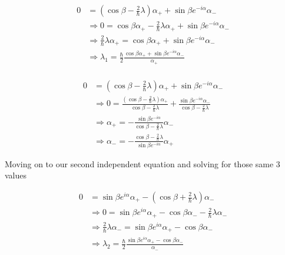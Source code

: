 \begin{answer}
  \begin{equation}
    \begin{split}
      0
      &= (\cos{\beta}-\frac{2}{\hbar}\lambda)\alpha_+ + \sin{\beta}e^{-i\alpha}\alpha_-\\
      &\Rightarrow
      0 = \cos{\beta}\alpha_+ - \frac{2}{\hbar}\lambda\alpha_+ + \sin{\beta}e^{-i\alpha}\alpha_-\\
      &\Rightarrow
      \frac{2}{\hbar}\lambda\alpha_+ = \cos{\beta}\alpha_+ + \sin{\beta}e^{-i\alpha}\alpha_-\\
      &\Rightarrow
      \lambda_1 = \frac{\hbar}{2}\frac{\cos{\beta}\alpha_+ + \sin{\beta}e^{-i\alpha}\alpha_-}{\alpha_+}\\
    \end{split}
  \end{equation}

  \begin{equation}
    \begin{split}
      0
      &= (\cos{\beta}-\frac{2}{\hbar}\lambda)\alpha_+ + \sin{\beta}e^{-i\alpha}\alpha_-\\
      &\Rightarrow
      0 = \frac{(\cos{\beta}-\frac{2}{\hbar}\lambda)\alpha_+}{\cos{\beta}-\frac{2}{\hbar}\lambda} + \frac{\sin{\beta}e^{-i\alpha}\alpha_-}{\cos{\beta}-\frac{2}{\hbar}\lambda}\\
      &\Rightarrow
      \alpha_+ = - \frac{\sin{\beta}e^{-i\alpha}}{\cos{\beta}-\frac{2}{\hbar}\lambda}\alpha_-\\
      &\Rightarrow
      \alpha_- = - \frac{\cos{\beta}-\frac{2}{\hbar}\lambda}{\sin{\beta}e^{-i\alpha}}\alpha_+
    \end{split}
  \end{equation}

  Moving on to our second independent equation and solving for those same 3 values
  
  \begin{equation}
    \begin{split}
      0
      &= \sin{\beta}e^{i\alpha}\alpha_+ - (\cos{\beta} + \frac{2}{\hbar}\lambda)\alpha_-\\
      &\Rightarrow
      0 = \sin{\beta}e^{i\alpha}\alpha_+ - \cos{\beta}\alpha_- - \frac{2}{\hbar}\lambda\alpha_-\\
      &\Rightarrow
      \frac{2}{\hbar}\lambda\alpha_- = \sin{\beta}e^{i\alpha}\alpha_+ - \cos{\beta}\alpha_-\\
      &\Rightarrow
      \lambda_2 = \frac{\hbar}{2}\frac{\sin{\beta}e^{i\alpha}\alpha_+ - \cos{\beta}\alpha_-}{\alpha_-}\\
    \end{split}
  \end{equation}
  

\end{answer}
